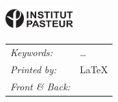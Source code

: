 \begin{titlepage}
\vfill
\begin{center}
    \includegraphics[height=1cm]{title/logos/institut-pasteur-logo-2020}
    \hspace{2em}
\end{center}
\vfill

\noindent
\begin{tabular}{@{}p{}@{}p{}}
    \textit{Keywords:} & \ldots \\[\medskipamount]
    \textit{Printed by:} & \LaTeX \\[\medskipamount]
    \textit{Front \& Back:} & 
\end{tabular}

\vspace{4\bigskipamount}




\medskip

\medskip

\end{titlepage}

